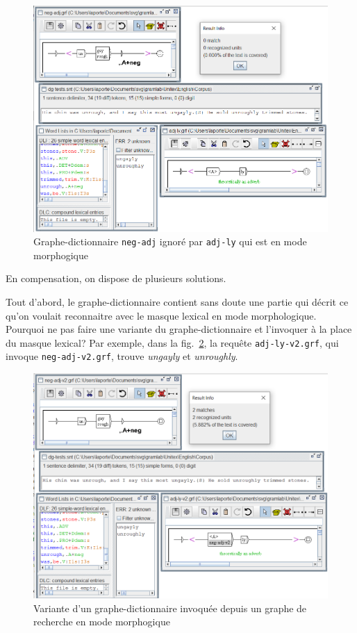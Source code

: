 \begin{figure}[!th]
\begin{center}
\includegraphics[width=15cm]{resources/img/fig3-exp1.png}
\caption{Graphe-dictionnaire \texttt{neg-adj} ignoré par \texttt{adj-ly} qui est en mode morphogique\label{3-exp1}}
\end{center}
\end{figure}


\bigskip
\noindent En compensation, on dispose de plusieurs solutions.

\bigskip
\noindent Tout d'abord, le graphe-dic\-tion\-naire contient sans doute une partie qui décrit
ce qu'on voulait reconnaitre avec le masque lexical en mode morphologique. Pourquoi ne pas
faire une variante du graphe-dic\-tion\-naire et l'invoquer à la place du masque lexical? Par
exemple, dans la fig.~\ref{3-exp7}, la requête
\verb+adj-ly-v2.grf+, qui invoque \verb+neg-adj-v2.grf+, trouve \textit{ungayly} et \textit{unroughly}.

\begin{figure}[th]
\begin{center}
\includegraphics[width=15cm]{resources/img/fig3-exp7.png}
\caption{Variante d'un graphe-dictionnaire invoquée depuis un graphe de recherche en mode morphogique\label{3-exp7}}
\end{center}
\end{figure}

